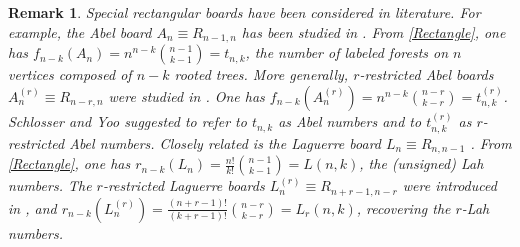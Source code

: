 \documentclass[10pt]{amsart}
\newtheorem{remark}[theorem]{Remark}%
\begin{document}
\begin{remark}
Special rectangular boards have been considered in literature. For example, the {\em Abel board} $A_n \equiv R_{n-1,n}$ has been studied in \cite{JGJH2000,MSMY2017}. From \eqref{Rectangle}, one has $f_{n-k}(A_n)=n^{n-k} \binom{n-1}{k-1}=t_{n,k}$, the number of labeled forests on $n$ vertices composed of $n-k$ rooted trees. More generally, {\em $r$-restricted Abel boards} $A_n^{(r)}\equiv R_{n-r,n}$ were studied in \cite{MSMY2017}. One has $f_{n-k}(A_n^{(r)})=n^{n-k} \binom{n-r}{k-r}=t_{n,k}^{(r)}$. Schlosser and Yoo \cite{MSMY2017} suggested to refer to $t_{n,k}$ as {\em Abel numbers} and to $t_{n,k}^{(r)}$ as {\em $r$-restricted Abel numbers}. Closely related is the {\em Laguerre board} $L_n \equiv R_{n,n-1}$ \cite{GR1986}. From \eqref{Rectangle}, one has $r_{n-k}(L_n)=\frac{n!}{k!}\binom{n-1}{k-1}=L(n,k)$, the (unsigned) Lah numbers. The {\em $r$-restricted Laguerre boards} $L_n^{(r)}\equiv R_{n+r-1,n-r}$ were introduced in \cite{MSMY2017}, and $r_{n-k}(L_n^{(r)})=\frac{(n+r-1)!}{(k+r-1)!}\binom{n-r}{k-r}=L_r(n,k)$, recovering the $r$-Lah numbers.  
\end{remark}
\end{document}
